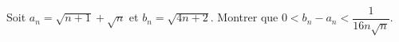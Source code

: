 Soit $a_n = \sqrt{n + 1} + \sqrt{n}$ et $b_n = \sqrt{4n + 2}$. Montrer que $0 < b_n - a_n < \dfrac{1}{16n\sqrt{n}}$.
